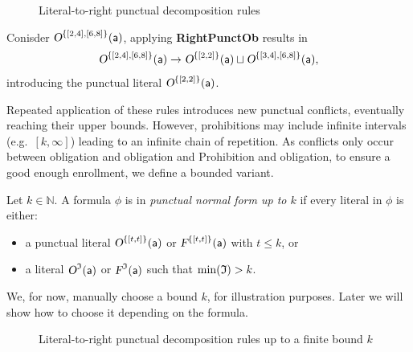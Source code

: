 \begin{figure}[h]
\centering
{}
\caption{Literal-to-right punctual decomposition rules}
\label{deccompressrules}
\end{figure}

\begin{example}
Conisder $\textsl{O}^{\{[2,4],[6,8]\}}(\mathsf{a})$, applying \textbf{RightPunctOb} results in 
\[
\textsl{O}^{\{[2,4],[6,8]\}}(\mathsf{a})
\to
\textsl{O}^{\{[2,2]\}}(\mathsf{a}) \sqcup \textsl{O}^{\{[3,4],[6,8]\}}(\mathsf{a}),
\]
introducing the punctual literal $\textsl{O}^{\{[2,2]\}}(\mathsf{a})$.
\end{example}

Repeated application of these rules introduces new punctual conflicts, eventually reaching their upper bounds. However, prohibitions may include infinite intervals (e.g.\ $[k,\infty]$) leading to an infinite chain of repetition. As conflicts only occur between obligation and obligation and Prohibition and obligation, to ensure a good enough enrollment, we define a bounded variant.

\begin{definition}
Let \(k \in \mathbb{N}\).  
A formula $\phi$ is in \emph{punctual normal form up to \(k\)} if every literal in $\phi$ is either:
\begin{itemize}
  \item a punctual literal $\textsl{O}^{\{[t,t]\}}(\mathsf{a})$ or $\textsl{F}^{\{[t,t]\}}(\mathsf{a})$ with \(t \le k\), or
  \item a literal $\textsl{O}^{\mathfrak{I}}(\mathsf{a})$ or $\textsl{F}^{\mathfrak{I}}(\mathsf{a})$ such that $\min(\mathfrak{I}) > k$.
\end{itemize}
\end{definition}

We, for now, manually choose  a bound \(k\), for illustration purposes. Later we will show how to  choose it depending on the formula.

\begin{figure}[h]
\centering
{}
\caption{Literal-to-right punctual decomposition rules up to a finite bound \(k\)}
\label{deccompressrulesbound}
\end{figure}

